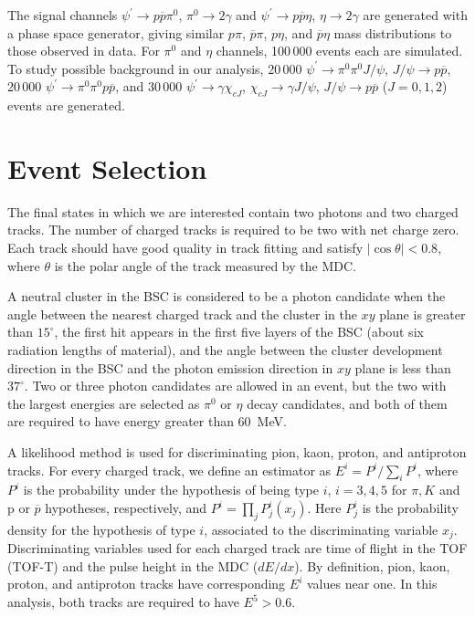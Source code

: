 \documentclass[prd,twocolumn,showpacs,amsmath,amssymb]{revtex4}
\newcommand{\dedx}{dE/dx}
\newcommand{\jpsi}{J/\psi}
\newcommand{\chicJ}{\chi_{cJ}}
\newcommand{\piz}{\pi^0}
\newcommand{\ppb}{p\overline{p}}
\newcommand{\jpsito}{J/\psi \rightarrow }
\newcommand{\psipto}{\psi^\prime \rightarrow }
\newcommand{\pspto}{\psi^\prime \rightarrow }
\newcommand{\chicJto}{\chi_{cJ} \rightarrow }
\newcommand{\g}{\gamma}
\begin{document}
The signal channels $\psipto \ppb \piz$, $\piz \to 2\gamma$ and
$\psipto \ppb \eta$, $\eta \to 2\gamma$ are generated with a phase
space generator, giving similar $p\pi$, $\overline{p}\pi$,
$p\eta$, and $\overline{p}\eta$ mass distributions to those
observed in data.  For $\piz$ and $\eta$ channels, 100\,000 events
each are simulated. To study possible background in our analysis,
20\,000 $\pspto \piz \piz \jpsi$, $\jpsito \ppb$, 20\,000 $\psipto
\piz \piz \ppb$, and 30\,000 $\pspto \g \chicJ$, $\chicJto \g
\jpsi$, $\jpsito \ppb$ ($J=0,1,2$) events are generated.

\section{Event Selection}

The final states in which we are interested contain two photons
and two charged tracks. The number of charged tracks is required
to be two with net charge zero.  Each track should have good
quality in track fitting and satisfy $|\cos\theta|<0.8$, where
$\theta$ is the polar angle of the track measured by the MDC.

A neutral cluster in the BSC is considered to be a photon
candidate when the angle between the nearest charged track and the
cluster in the $xy$ plane is greater than $15^{\circ}$, the first
hit appears in the first five layers of the BSC (about six
radiation lengths of material), and the angle between the cluster
development direction in the BSC and the photon emission direction
in $xy$ plane is less than $37^{\circ}$. Two or three photon
candidates are allowed in an event, but the two with the largest
energies are selected as $\pi^0$ or $\eta$ decay candidates, and
both of them are required to have energy greater than 60~MeV.

A likelihood method is used for discriminating pion, kaon, proton,
and antiproton tracks. For every charged track, we define an
estimator as $E^{i}=P^{i}/\sum_{i} P^{i}$, where $P^{i}$ is the
probability under the hypothesis of being type $i$, $i=3,4,5$ for
$\pi, K$ and p or $\overline{p}$ hypotheses, respectively, and
$P^{i}=\prod_{j} P_{j}^{i}(x_{j})$. Here $P_{j}^{i}$ is the
probability density for the hypothesis of type $i$, associated to
the discriminating variable $x_{j}$. Discriminating variables used
for each charged track are time of flight in the TOF (TOF-T) and
the pulse height in the MDC ($\dedx$). By definition, pion, kaon,
proton, and antiproton tracks have corresponding $E^{i}$ values
near one. In this analysis, both tracks are required to have
$E^{5}>0.6$.
\end{document}
